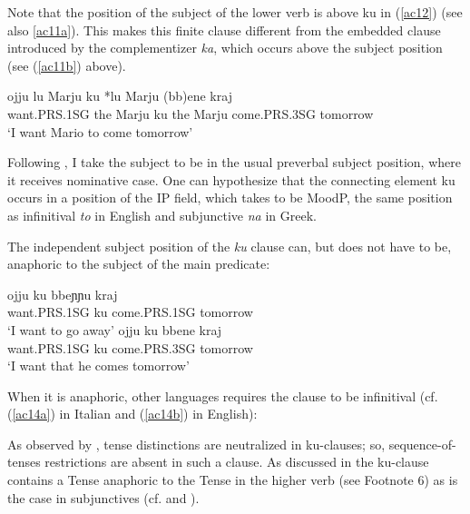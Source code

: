 \documentclass[output=paper]{langscibook}
\begin{document}
Note that the position of the subject of the lower verb is above ku in (\ref{ac12}) (see also \ref{ac11a}). This makes this finite clause different from the embedded clause introduced by the complementizer \textit{ka}, which occurs above the subject position (see (\ref{ac11b}) above). 

\ea\label{ac12}
\gll ojju   {lu Marju} ku {*lu Marju} (bb)ene  kraj \\
 want.PRS.1SG {the Marju} ku {the Marju}  come.PRS.3SG tomorrow\\
\glt ‘I want Mario to come tomorrow’
\z

Following \citet[36]{calabrese1993a}, I take the subject to be in the usual preverbal subject position, where it receives nominative case.  One can hypothesize that the connecting element ku occurs in a position of the IP field, which \citet{roberts2003a} takes to be MoodP, the same position as infinitival \textit{to} in English and subjunctive \textit{na} in Greek.

The independent subject position of the \textit{ku} clause can, but does not have to be, anaphoric to the subject of the main predicate:

\ea \label{ac13}
    \ea \label{ac13a}
        \gll ojju          ku   bbeɲɲu      kraj\\
   want.PRS.1SG   ku    come.PRS.1SG  tomorrow\\
    \glt   ‘I want to go away’
    \ex \label{ac13b}
        \gll ojju          ku   bbene       kraj \\
   want.PRS.1SG   ku   come.PRS.3SG  tomorrow\\
    \glt ‘I want that he comes tomorrow’
    \z
\z

When it is anaphoric, other languages requires the clause to be infinitival (cf. (\ref{ac14a}) in Italian and (\ref{ac14b}) in English):

\ea \label{ac14}
    \z
\z

 As observed by \cite{calabrese1993a}, tense distinctions are neutralized in ku-clauses; so, sequence-of-tenses restrictions are absent in such a clause.  As discussed in \cite{calabrese1993a} the ku-clause contains a Tense anaphoric to the Tense in the higher verb (see Footnote 6) as is the case in subjunctives (cf. \cite[p46-48]{calabrese1993a} and \cite[p652]{manzini2005a}).
\end{document}
